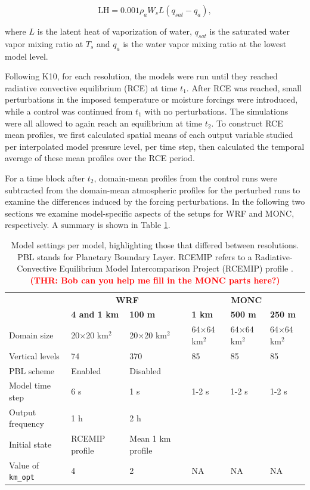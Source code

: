 \documentclass[draft]{agujournal2019}
\newcommand{\todo}[1]{\textcolor{red}{\textbf{(#1)}}}
\begin{document}
\begin{equation}
\textrm{LH} = 0.001 \rho_a W_s L (q_{sat} - q_a),
\label{eq:LH}
\end{equation}

\noindent where $L$ is the latent heat of vaporization of water, $q_{sat}$ is
the saturated water vapor mixing ratio at $T_s$ and $q_a$ is the water vapor
mixing ratio at the lowest model level. 

Following K10, for each resolution, the models were run until they reached
radiative convective equilibrium (RCE) at time $t_1$. After RCE was reached,
small perturbations in the imposed temperature or moisture forcings were
introduced, while a control was continued from $t_1$ with no perturbations. The
simulations were all allowed to again reach an equilibrium at time $t_2$. To
construct RCE mean profiles, we first calculated spatial means of each output
variable studied per interpolated model pressure level, per time step, then
calculated the temporal average of these mean profiles over the RCE period.

For a time block after $t_2$, domain-mean profiles from the control runs were
subtracted from the domain-mean atmospheric profiles for the perturbed runs to
examine the differences induced by the forcing perturbations. In the following
two sections we examine model-specific aspects of the setups for WRF and MONC,
respectively. A summary is shown in Table \ref{tab:model_setups}.

{
\begin{table}
    \centering
    \caption{Model settings per model, highlighting those that differed between
    resolutions. PBL stands for Planetary Boundary Layer. RCEMIP refers to a
    Radiative-Convective Equilibrium Model Intercomparison Project (RCEMIP)
    profile \cite{Wing_GMD_2018}. \todo{THR: Bob can you help me fill in the
    MONC parts here?}}
    \label{tab:model_setups}
    \renewcommand{\arraystretch}{0.65}
    \footnotesize
    \begin{tabular}{lll|lll}
        & \multicolumn{2}{c|}{\textbf{WRF}} & \multicolumn{3}{c}{\textbf{MONC}} \\
        & \textbf{4 and 1 km} & \textbf{100 m} & \textbf{1 km} & \textbf{500 m} & \textbf{250 m} \\
        \hline
        Domain size & 20$\times$20 km$^2$ & 20$\times$20 km$^2$ & 64$\times$64 km$^2$ & 64$\times$64 km$^2$ & 64$\times$64 km$^2$ \\
        Vertical levels & 74 & 370 & 85 & 85 & 85 \\
        PBL scheme & Enabled & Disabled & & & \\
        Model time step & 6 s & 1 s & 1-2 s & 1-2 s & 1-2 s\\
        Output frequency & 1 h & 2 h & & & \\
        Initial state & RCEMIP profile & Mean 1 km profile & & & \\
        Value of \texttt{km\_opt} & 4 & 2 & NA & NA & NA \\
        \hline
    \end{tabular}
\end{table}
}
\end{document}
